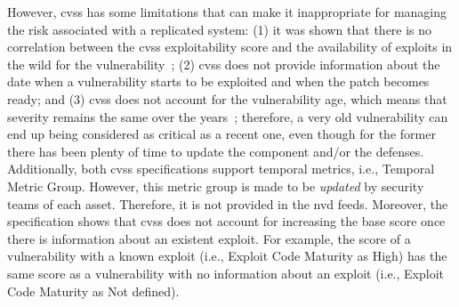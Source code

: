 However, \gls{cvss} has some limitations that can make it inappropriate for managing the risk associated with a replicated system:
(1)  it was shown that there is no correlation between the \gls{cvss} exploitability score and the availability of exploits in the wild for the vulnerability~\cite{Bozorgi:2010}; 
(2) \gls{cvss} does not provide information about the date when a vulnerability starts to be exploited and when the patch becomes ready; 
and (3) \gls{cvss} does not account for the vulnerability age, which means that severity remains the same over the years~\cite{Frei:2006}; therefore, a very old vulnerability can end up being considered as critical as a recent one, even though for the former there has been plenty of time to update the component and/or the defenses.  
Additionally, both \gls{cvss} specifications support temporal metrics, i.e., Temporal Metric Group. 
However, this metric group is made to be \emph{updated} by security teams of each asset. 
Therefore, it is not provided in the \gls{nvd} feeds. 
Moreover, the specification shows that \gls{cvss} does not account for increasing the base score once there is information about an existent exploit. 
For example, the score of a vulnerability with a known exploit (i.e., Exploit Code Maturity as High) has the same score as a vulnerability with no information about an exploit (i.e., Exploit Code Maturity as Not defined). 




